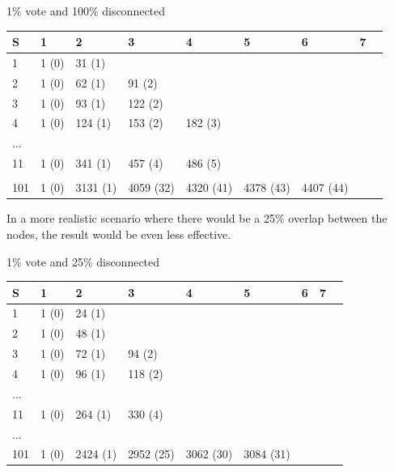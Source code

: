 1\% vote and 100\% disconnected
\begin{table}[h!]
	\begin{tabular}{@{}l|llllllll@{}}
		\toprule
		S & 1     & 2        & 3         & 4         & 5         & 6         & 7     \\ \midrule
		1   & 1 (0) & 31 (1)   &     &        &           &           &               \\
		2   & 1 (0) & 62 (1)   & 91 (2)    &     &      &           &               \\
		3   & 1 (0) & 93 (1)   & 122 (2)   &    &        &           &               \\
		4   & 1 (0) & 124 (1)  & 153 (2)   & 182 (3)   &    &       &               \\
		... &       &          &           &           &           &           &             \\
		11  & 1 (0) & 341 (1)  & 457 (4)   & 486 (5)   &    &       &     \\
		 &       &          &           &           &           &           &     \\
		101 & 1 (0) & 3131 (1) & 4059 (32) & 4320 (41) & 4378 (43) & 4407 (44) &  \\ \bottomrule
	\end{tabular}
\end{table}

In a more realistic scenario where there would be a 25\% overlap between the nodes, the result would be even less effective.

1\% vote and 25\% disconnected
\begin{table}[h!]
	\begin{tabular}{@{}l|llllllll@{}}
		\toprule
		S & 1     & 2        & 3         & 4         & 5         & 6         & 7     \\ \midrule
		1   & 1 (0) & 24 (1)   &     &        &           &           &               \\
		2   & 1 (0) & 48 (1)   &     &     &      &           &               \\
		3   & 1 (0) & 72 (1)   & 94 (2)   &    &        &           &               \\
		4   & 1 (0) & 96 (1)  & 118 (2)   &    &    &       &               \\
		... &       &          &           &           &           &           &             \\
		11  & 1 (0) & 264 (1)  & 330 (4)   &    &   &       &     \\
		... &       &          &           &           &           &           &     \\
		101 & 1 (0) & 2424 (1) & 2952 (25) & 3062 (30) & 3084 (31) &  &  \\ \bottomrule
	\end{tabular}
\end{table}

